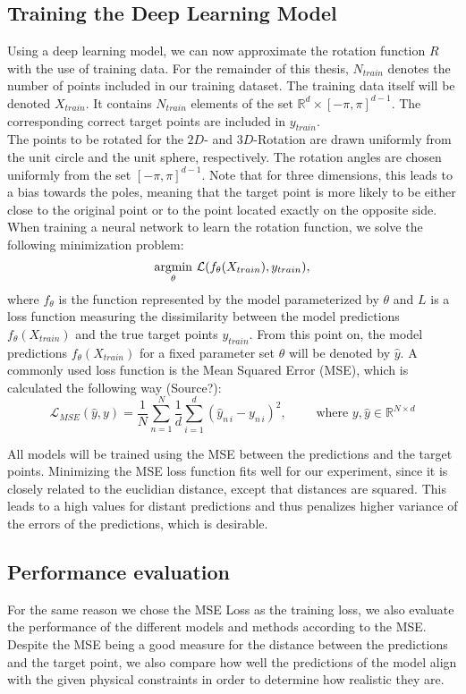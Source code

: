 \subsection{Training the Deep Learning Model}
\indent Using a deep learning model, we can now approximate the rotation function $R$ with the use of training data. For the remainder of this thesis, $N_{train}$ denotes the number of points included in our training dataset. The training data itself will be denoted $X_{train}$. It contains $N_{train}$ elements of the set $\mathbb{R}^{d} \times [- \pi, \pi] ^{d-1}$. The corresponding correct target points are included in $y_{train}$.\\
\indent The points to be rotated for the $2D$- and $3D$-Rotation are drawn uniformly from the unit circle and the unit sphere, respectively. The rotation angles are chosen uniformly from the set $[-\pi, \pi]^{d-1}$. Note that for three dimensions, this leads to a bias towards the poles, meaning that the target point is more likely to be either close to the original point or to the point located exactly on the opposite side.\\
\indent When training a neural network to learn the rotation function, we solve the following minimization problem:
\[\underset{\theta}{\operatorname*{argmin}} \,\, \mathcal{L}(f_{\theta} (X_{train}), y_{train}), \]
where $f_\theta$ is the function represented by the model parameterized by $\theta$ and $L$ is a loss function measuring the dissimilarity between the model predictions $f_{\theta} (X_{train})$ and the true target points $y_{train}$. From this point on, the model predictions $f_{\theta} (X_{train})$ for a fixed parameter set $\theta$ will be denoted by $\hat{y}$.
A commonly used loss function is the Mean Squared Error (MSE), which is calculated the following way (Source?):
\[\mathcal{L}_{MSE}(\hat{y}, y) = \frac{1}{N}\sum_{n = 1}^{N} \frac{1}{d} \sum_{i = 1}^{d} (\hat{y}_{n\,i} - y_{n\,i})^2, \qquad \text{ where } y, \hat{y} \in \mathbb{R}^{N \times d}\]

\indent All models will be trained using the MSE between the predictions and the target points. Minimizing the MSE loss function fits well for our experiment, since it is closely related to the euclidian distance, except that distances are squared. This leads to a high values for distant predictions and thus penalizes higher variance of the errors of the predictions, which is desirable.\\ 

\subsection{Performance evaluation}
For the same reason we chose the MSE Loss as the training loss, we also evaluate the performance of the different models and methods according to the MSE. Despite the MSE being a good measure for the distance between the predictions and the target point, we also compare how well the predictions of the model align with the given physical constraints in order to determine how realistic they are.\\

